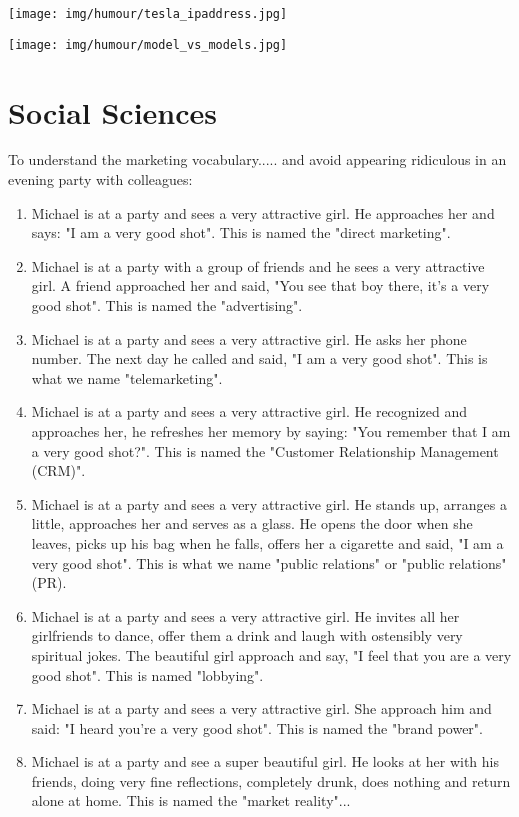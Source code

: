 	\begin{center}
	\texttt{[image: img/humour/tesla\_ipaddress.jpg]}
	\end{center}
	
	\begin{center}
	\texttt{[image: img/humour/model\_vs\_models.jpg]}
	\end{center}

	\pagebreak
	\section{Social Sciences}
	
To understand the marketing vocabulary..... and avoid appearing ridiculous in an evening party with colleagues:
\begin{enumerate}
	\item Michael is at a party and sees a very attractive girl. He approaches her and says: "I am a very good shot". This is named the "direct marketing".

	\item Michael is at a party with a group of friends and he sees a very attractive girl. A friend approached her and said, "You see that boy there, it's a very good shot". This is named the "advertising".

	\item Michael is at a party and sees a very attractive girl. He asks her phone number. The next day he called and said, "I am a very good shot". This is what we name "telemarketing".

	\item Michael is at a party and sees a very attractive girl. He recognized and approaches her, he refreshes her memory by saying: "You remember that I am a very good shot?". This is named the "Customer Relationship Management (CRM)".

	\item Michael is at a party and sees a very attractive girl. He stands up, arranges a little, approaches her and serves as a glass. He opens the door when she leaves, picks up his bag when he falls, offers her a cigarette and said, "I am a very good shot". This is what we name "public relations" or "public relations" (PR).

	\item Michael is at a party and sees a very attractive girl. He invites all her girlfriends to dance, offer them a drink and laugh with ostensibly very spiritual jokes. The beautiful girl approach and say, "I feel that you are a very good shot". This is named "lobbying".

	\item Michael is at a party and sees a very attractive girl. She approach him and said: "I heard you're a very good shot". This is named the "brand power".

	\item Michael is at a party and see a super beautiful girl. He looks at her with his friends, doing very fine reflections, completely drunk, does nothing and return alone at home. This is named the "market reality"...
\end{enumerate}

